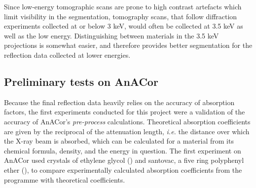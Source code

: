 Since low-energy tomographic scans are prone to high contrast artefacts which limit visibility in the segmentation, tomography scans, that follow diffraction experiments collected at or below 3 \unit{keV}, would often be collected at 3.5 \unit{keV} as well as the low energy. Distinguishing between materials in the 3.5 \unit{keV} projections is somewhat easier, and therefore provides better segmentation for the reflection data collected at lower energies.




\subsection{Preliminary tests on AnACor}

Because the final reflection data heavily relies on the accuracy of absorption factors, the first experiments conducted for this project were a validation of the accuracy of AnACor's \textit{pre-process} calculations. Theoretical absorption coefficients are given by the reciprocal of the attenuation length, \textit{i.e.}  the distance over which the X-ray beam is absorbed, which can be calculated for a material from its chemical formula, density, and the energy in question. The first experiment on AnACor used crystals of ethylene glycol () and santovac, a five ring polyphenyl ether (), to compare experimentally calculated absorption coefficients from the programme with theoretical coefficients.

